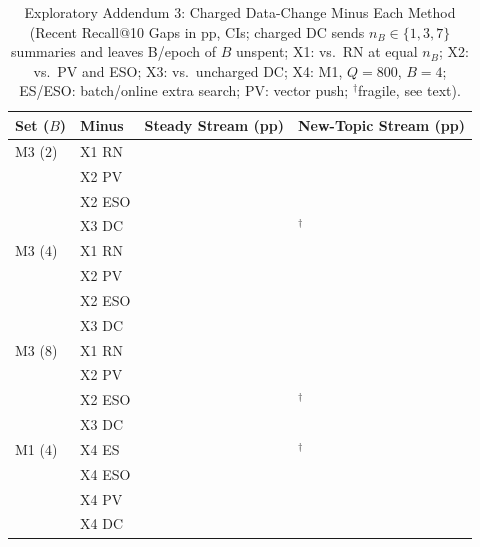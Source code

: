 \begin{table}[!t]
\centering
\caption{Exploratory Addendum 3: Charged Data-Change Minus Each Method (Recent Recall@10 Gaps in pp, \RNumCIPct{} CIs;
charged DC sends $n_B \in \{1, 3, 7\}$ summaries and leaves \RNumAddThreeDCUnspentEpochBytes{} B/epoch of $B$ unspent; X1: vs.\ RN at equal $n_B$; X2: vs.\ PV and ESO; X3: vs.\
uncharged DC; X4: M1, $Q{=}800$, $B{=}4$; ES/ESO: batch/online extra search; PV: vector push;
$^\dagger$fragile, see text).}
\label{tab:add3}
\scriptsize
\renewcommand{\arraystretch}{0.68}
\setlength{\tabcolsep}{3.0pt}
\begin{tabular}{@{}llll@{}}
\toprule
Set ($B$) & Minus & Steady Stream (pp) & New-Topic Stream (pp) \\
\midrule
M3 ($2$) & X1 RN & \RNumAddThreeXOneRNBTwoSteadyCell{} & \RNumAddThreeXOneRNBTwoNewTopicCell{} \\
         & X2 PV & \RNumAddThreeXTwoPVBTwoSteadyCell{} & \RNumAddThreeXTwoPVBTwoNewTopicCell{} \\
         & X2 ESO & \RNumAddThreeXTwoESOBTwoSteadyCell{} & \RNumAddThreeXTwoESOBTwoNewTopicCell{} \\
         & X3 DC & \RNumAddThreeXThreeDCBTwoSteadyCell{} & \RNumAddThreeXThreeDCBTwoNewTopicCell{}$^\dagger$ \\
M3 ($4$) & X1 RN & \RNumAddThreeXOneRNBFourSteadyCell{} & \RNumAddThreeXOneRNBFourNewTopicCell{} \\
         & X2 PV & \RNumAddThreeXTwoPVBFourSteadyCell{} & \RNumAddThreeXTwoPVBFourNewTopicCell{} \\
         & X2 ESO & \RNumAddThreeXTwoESOBFourSteadyCell{} & \RNumAddThreeXTwoESOBFourNewTopicCell{} \\
         & X3 DC & \RNumAddThreeXThreeDCBFourSteadyCell{} & \RNumAddThreeXThreeDCBFourNewTopicCell{} \\
M3 ($8$) & X1 RN & \RNumAddThreeXOneRNBEightSteadyCell{} & \RNumAddThreeXOneRNBEightNewTopicCell{} \\
         & X2 PV & \RNumAddThreeXTwoPVBEightSteadyCell{} & \RNumAddThreeXTwoPVBEightNewTopicCell{} \\
         & X2 ESO & \RNumAddThreeXTwoESOBEightSteadyCell{} & \RNumAddThreeXTwoESOBEightNewTopicCell{}$^\dagger$ \\
         & X3 DC & \RNumAddThreeXThreeDCBEightSteadyCell{} & \RNumAddThreeXThreeDCBEightNewTopicCell{} \\
M1 ($4$) & X4 ES & \RNumAddThreeXFourESSteadyCell{} & \RNumAddThreeXFourESNewTopicCell{}$^\dagger$ \\
         & X4 ESO & \RNumAddThreeXFourESOSteadyCell{} & \RNumAddThreeXFourESONewTopicCell{} \\
         & X4 PV & \RNumAddThreeXFourPVSteadyCell{} & \RNumAddThreeXFourPVNewTopicCell{} \\
         & X4 DC & \RNumAddThreeXFourDCSteadyCell{} & \RNumAddThreeXFourDCNewTopicCell{} \\
\bottomrule
\end{tabular}
\end{table}

